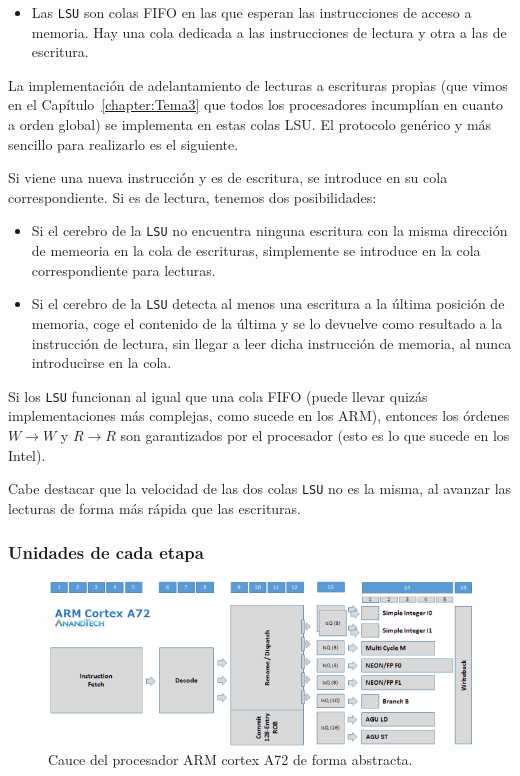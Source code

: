 \begin{itemize}
\begin{itemize}
            \item Las \verb|LSU| son colas FIFO en las que esperan las instrucciones de acceso a memoria. Hay una cola dedicada a las instrucciones de lectura y otra a las de escritura. 
        \end{itemize}
    La implementación de adelantamiento de lecturas a escrituras propias (que vimos en el Capítulo~\ref{chapter:Tema3} que todos los procesadores incumplían en cuanto a orden global) se implementa en estas colas LSU\@. El protocolo genérico y más sencillo para realizarlo es el siguiente.

    Si viene una nueva instrucción y es de escritura, se introduce en su cola correspondiente. Si es de lectura, tenemos dos posibilidades:
    \begin{itemize}
        \item Si el cerebro de la \verb|LSU| no encuentra ninguna escritura con la misma dirección de memeoria en la cola de escrituras, simplemente se introduce en la cola correspondiente para lecturas.
        \item Si el cerebro de la \verb|LSU| detecta al menos una escritura a la última posición de memoria, coge el contenido de la última y se lo devuelve como resultado a la instrucción de lectura, sin llegar a leer dicha instrucción de memoria, al nunca introducirse en la cola.
    \end{itemize}
    Si los \verb|LSU| funcionan al igual que una cola FIFO (puede llevar quizás implementaciones más complejas, como sucede en los ARM), entonces los órdenes $W\rightarrow W$ y $R\rightarrow R$ son garantizados por el procesador (esto es lo que sucede en los Intel).

    Cabe destacar que la velocidad de las dos colas \verb|LSU| no es la misma, al avanzar las lecturas de forma más rápida que las escrituras.
\end{itemize}

\subsubsection{Unidades de cada etapa}

\begin{figure}
    \centering
    \includegraphics[width=0.8\linewidth]{Images/Cauce2.png}
    \caption{Cauce del procesador ARM cortex A72 de forma abstracta.}
    \label{fig:Cauce_ARM_cortex_a72}
\end{figure}

